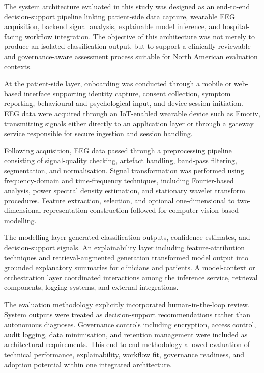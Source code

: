 The system architecture evaluated in this study was designed as an end-to-end decision-support pipeline linking patient-side data capture, wearable EEG acquisition, backend signal analysis, explainable model inference, and hospital-facing workflow integration. The objective of this architecture was not merely to produce an isolated classification output, but to support a clinically reviewable and governance-aware assessment process suitable for North American evaluation contexts.

At the patient-side layer, onboarding was conducted through a mobile or web-based interface supporting identity capture, consent collection, symptom reporting, behavioural and psychological input, and device session initiation. EEG data were acquired through an IoT-enabled wearable device such as Emotiv, transmitting signals either directly to an application layer or through a gateway service responsible for secure ingestion and session handling.

Following acquisition, EEG data passed through a preprocessing pipeline consisting of signal-quality checking, artefact handling, band-pass filtering, segmentation, and normalisation. Signal transformation was performed using frequency-domain and time-frequency techniques, including Fourier-based analysis, power spectral density estimation, and stationary wavelet transform procedures. Feature extraction, selection, and optional one-dimensional to two-dimensional representation construction followed for computer-vision-based modelling.

The modelling layer generated classification outputs, confidence estimates, and decision-support signals. An explainability layer including feature-attribution techniques and retrieval-augmented generation transformed model output into grounded explanatory summaries for clinicians and patients. A model-context or orchestration layer coordinated interactions among the inference service, retrieval components, logging systems, and external integrations.

The evaluation methodology explicitly incorporated human-in-the-loop review. System outputs were treated as decision-support recommendations rather than autonomous diagnoses. Governance controls including encryption, access control, audit logging, data minimisation, and retention management were included as architectural requirements. This end-to-end methodology allowed evaluation of technical performance, explainability, workflow fit, governance readiness, and adoption potential within one integrated architecture.

